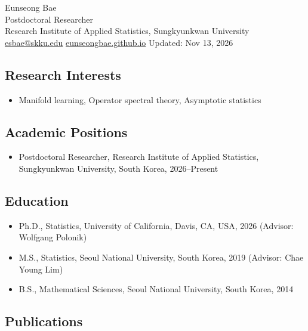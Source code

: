 \documentclass[11pt]{article}
\providecommand{\tightlist}{}
\begin{document}
\raggedright
{}\selectfont

\begin{center}
  {\Huge Eunseong Bae } \\[.75em]
  Postdoctoral Researcher \\ 
  Research Institute of Applied Statistics, Sungkyunkwan University \\
  \href{mailto:esbae@skku.edu}{esbae@skku.edu} \quad 
  \href{https://eunseongbae.github.io}{eunseongbae.github.io} \quad
  Updated: Nov 13, 2026 
\end{center}

\subsection*{Research Interests}

\begin{itemize}
\tightlist
\item
  Manifold learning, Operator spectral theory, Asymptotic statistics
\end{itemize}

\subsection*{Academic Positions}

\begin{itemize}
\tightlist
\item
  Postdoctoral Researcher, Research Institute of Applied Statistics,
  Sungkyunkwan University, South Korea, 2026--Present
\end{itemize}

\subsection*{Education}

\begin{itemize}
\tightlist
\item
  Ph.D., Statistics, University of California, Davis, CA, USA, 2026
  (Advisor: Wolfgang Polonik)
\item
  M.S., Statistics, Seoul National University, South Korea, 2019
  (Advisor: Chae Young Lim)
\item
  B.S., Mathematical Sciences, Seoul National University, South Korea,
  2014
\end{itemize}

\subsection*{Publications}
\end{document}
